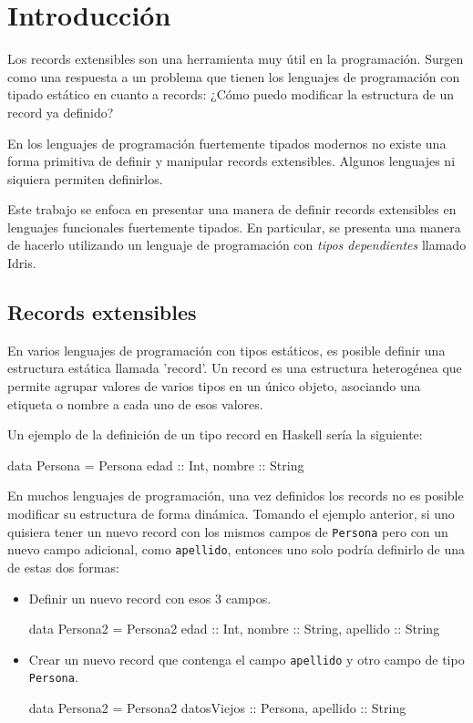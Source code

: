 
\chapter{Introducción}
\label{ch:1}

Los records extensibles son una herramienta muy útil en la programación. Surgen como una respuesta a un problema que tienen los lenguajes de programación con tipado estático en cuanto a records: ¿Cómo puedo modificar la estructura de un record ya definido?

En los lenguajes de programación fuertemente tipados modernos no existe una forma primitiva de definir y manipular records extensibles. Algunos lenguajes ni siquiera permiten definirlos.

Este trabajo se enfoca en presentar una manera de definir records extensibles en lenguajes funcionales fuertemente tipados. En particular, se presenta una manera de hacerlo utilizando un lenguaje de programación con \textit{tipos dependientes} llamado Idris.

\section{Records extensibles}

En varios lenguajes de programación con tipos estáticos, es posible definir una estructura estática llamada 'record'. Un record es una estructura heterogénea que permite agrupar valores de varios tipos en un único objeto, asociando una etiqueta o nombre a cada uno de esos valores.

Un ejemplo de la definición de un tipo record en Haskell sería la siguiente:

\begin{code}
data Persona = Persona { edad :: Int, nombre :: String }
\end{code}

En muchos lenguajes de programación, una vez definidos los records no es posible modificar su estructura de forma dinámica. Tomando el ejemplo anterior, si uno quisiera tener un nuevo record con los mismos campos de \texttt{Persona} pero con un nuevo campo adicional, como \texttt{apellido}, entonces uno solo podría definirlo de una de estas dos formas:

\begin{itemize}[noitemsep]
\item Definir un nuevo record con esos 3 campos.
\begin{code}
data Persona2 = Persona2 {
  edad :: Int,
  nombre :: String,
  apellido :: String
}
\end{code}
\item Crear un nuevo record que contenga el campo \texttt{apellido} y otro campo de tipo \texttt{Persona}.
\begin{code}
data Persona2 = Persona2 {
  datosViejos :: Persona,
  apellido :: String
}
\end{code}
\end{itemize}

